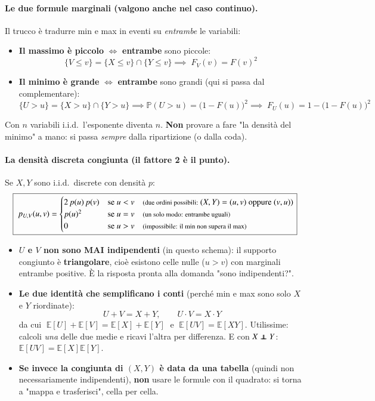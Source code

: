 \documentclass[12pt]{extarticle} %
\newcommand\independent{\protect\mathpalette{\protect\independenT}{\perp}}
\def\independenT#1#2{\mathrel{\rlap{$#1#2$}\mkern2mu{#1#2}}}
\begin{document}
\paragraph{Le due formule marginali (valgono anche nel caso continuo).} Il trucco è tradurre min e max in eventi su \emph{entrambe} le variabili:
\begin{itemize}
    \item \textbf{Il massimo è piccolo} $\iff$ \textbf{entrambe} sono piccole:
    $$ \{V \le v\} = \{X \le v\} \cap \{Y \le v\} \implies \boxed{\;F_V(v) = F(v)^2\;} $$
    \item \textbf{Il minimo è grande} $\iff$ \textbf{entrambe} sono grandi (qui si passa dal complementare):
    $$ \{U > u\} = \{X > u\} \cap \{Y > u\} \implies \mathbb{P}(U > u) = \big(1 - F(u)\big)^2 \implies \boxed{\;F_U(u) = 1 - \big(1-F(u)\big)^2\;} $$
\end{itemize}
{\footnotesize Con $n$ variabili i.i.d.\ l'esponente diventa $n$. \textbf{Non} provare a fare "la densità del minimo" a mano: si passa \emph{sempre} dalla ripartizione (o dalla coda).}

\paragraph{La densità discreta congiunta (il fattore 2 è il punto).} Se $X, Y$ sono i.i.d.\ discrete con densità $p$:
$$ \boxed{\;p_{U,V}(u,v) = \begin{cases} 2\,p(u)\,p(v) & \text{se } u < v \quad \text{\footnotesize (due ordini possibili: } (X,Y)=(u,v) \text{ oppure } (v,u)\text{)} \\ p(u)^2 & \text{se } u = v \quad \text{\footnotesize (un solo modo: entrambe uguali)} \\ 0 & \text{se } u > v \quad \text{\footnotesize (impossibile: il min non supera il max)} \end{cases}} $$
\begin{itemize}
    \item \textbf{$U$ e $V$ non sono MAI indipendenti} (in questo schema): il supporto congiunto è \textbf{triangolare}, cioè esistono celle nulle ($u>v$) con marginali entrambe positive. È la risposta pronta alla domanda "sono indipendenti?".
    \item \textbf{Le due identità che semplificano i conti} (perché min e max sono solo $X$ e $Y$ riordinate):
    $$ U + V = X + Y, \qquad U \cdot V = X \cdot Y $$
    da cui $\;\mathbb{E}[U] + \mathbb{E}[V] = \mathbb{E}[X] + \mathbb{E}[Y]\;$ e $\;\mathbb{E}[UV] = \mathbb{E}[XY]$. {\footnotesize Utilissime: calcoli \emph{una} delle due medie e ricavi l'altra per differenza. E con $X \independent Y$: $\mathbb{E}[UV] = \mathbb{E}[X]\mathbb{E}[Y]$.}
    \item \textbf{Se invece la congiunta di $(X,Y)$ è data da una tabella} (quindi non necessariamente indipendenti), \textbf{non} usare le formule con il quadrato: si torna a "mappa e trasferisci", cella per cella.
\end{itemize}
\end{document}
